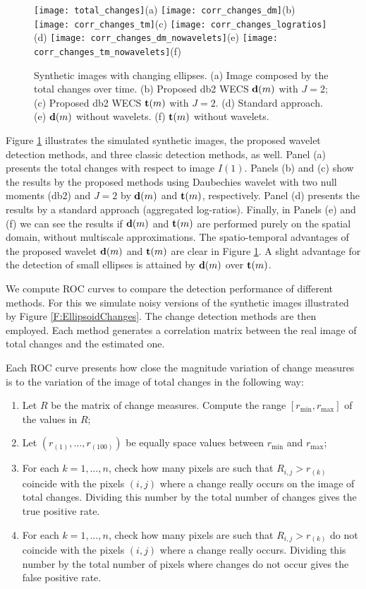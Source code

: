 \documentclass[journal]{IEEEtran}
\newcommand{\vd}{{\textbf d}}
\newcommand{\vt}{{\textbf t}}
\begin{document}
\begin{figure}[htp!]
\texttt{[image: total\_changes]}(a)
\texttt{[image: corr\_changes\_dm]}(b)
\texttt{[image: corr\_changes\_tm]}(c)
\texttt{[image: corr\_changes\_logratios]}(d)
\texttt{[image: corr\_changes\_dm\_nowavelets]}(e)
\texttt{[image: corr\_changes\_tm\_nowavelets]}(f)
\caption{Synthetic images with changing ellipses. (a) Image composed by the total changes over time. 
(b) Proposed db2 WECS $\vd(m)$ with $J=2$; (c) Proposed db2 WECS $\vt(m)$ with $J=2$.
(d) Standard approach. (e) $\vd(m)$ without wavelets. (f) $\vt(m)$  without wavelets. 
}
\label{F:Changes_methods_images}
\end{figure}

Figure \ref{F:Changes_methods_images} illustrates the simulated synthetic images, the proposed wavelet detection methods, and three classic detection methods, as well. Panel (a) presents the total changes with respect to image $I(1)$. Panels (b) and (c) show the results by the proposed methods using Daubechies wavelet with two null moments (db2) and $J=2$ by $\vd(m)$ and $\vt(m)$, respectively. Panel (d) presents the results by a standard approach (aggregated log-ratios). Finally, in Panels (e) and (f)  we can see the results if $\vd(m)$ and $\vt(m)$ are performed purely on the spatial domain, without multiscale approximations. The spatio-temporal advantages of the proposed wavelet  $\vd(m)$ and $\vt(m)$ are clear in Figure \ref{F:Changes_methods_images}. A slight advantage for the detection of small ellipses is attained by $\vd(m)$ over $\vt(m)$.   


We compute ROC curves to compare the detection performance of different methods. For this we simulate noisy versions of the synthetic images illustrated by Figure \ref{F:EllipsoidChanges}. The change detection methods are then employed. Each method generates a correlation matrix between the real image of total changes and the estimated one.

Each ROC curve presents how close the magnitude variation of change measures is to the variation of the image of total changes in the following way:
\begin{enumerate}
\item Let $R$ be the matrix of change measures. Compute the range $[r_{\min},r_{\max}]$ of the values in $R$;
\item Let $(r_{(1)},\ldots,r_{(100)})$ be equally space values between $r_{\min}$ and $r_{\max}$;
\item For each $k=1,\ldots,n$, check how many pixels are such that $R_{i,j}>r_{(k)}$ coincide with the pixels $(i,j)$ where a change really occurs on the image of total changes. Dividing this number by the total number of changes gives the true positive rate.
\item For each $k=1,\ldots,n$, check how many pixels are such that $R_{i,j}>r_{(k)}$  do not coincide with the pixels $(i,j)$ where a change really occurs. Dividing this number by the total number of pixels where changes do not occur gives the false positive rate.
\end{enumerate}
\end{document}
